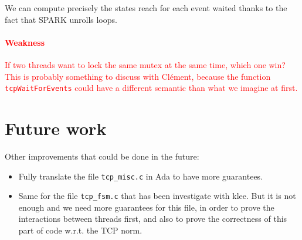 \documentclass[a4paper, 10pt]{article}
\begin{document}
    We can compute precisely the states reach for each event waited thanks to the fact that SPARK
    unrolls loops.

    \textcolor{red}{\paragraph{Weakness} If two threads want to lock the same mutex at the same time, which one win?
    This is probably something to discuss with Clément, because the function \texttt{tcpWaitForEvents} could have a
    different semantic than what we imagine at first.}


    \section{Future work}

    Other improvements that could be done in the future:
    \begin{itemize}
        \item Fully translate the file \texttt{tcp\_misc.c} in Ada to have more guarantees.
        \item Same for the file \texttt{tcp\_fsm.c} that has been investigate with klee. But
        it is not enough and we need more guarantees for this file, in order to prove the
        interactions between threads first, and also to prove the correctness of this part
        of code w.r.t. the TCP norm.
    \end{itemize}

    \printbibliography
    
\end{document}
